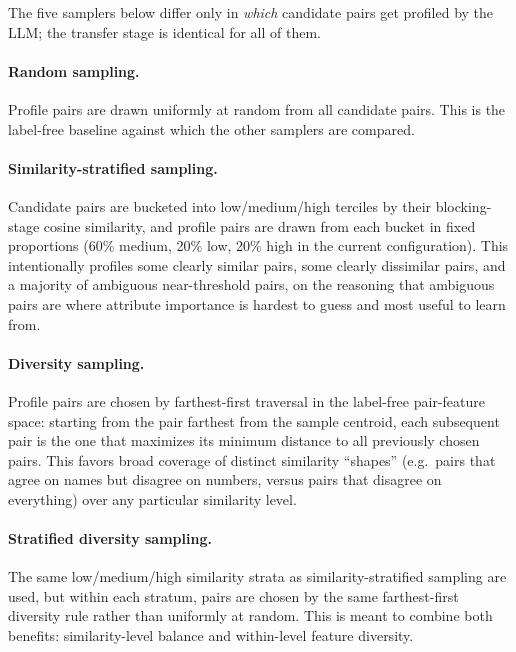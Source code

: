 \documentclass[11pt]{article}
\begin{document}
The five samplers below differ only in \emph{which} candidate pairs get profiled by
the LLM; the transfer stage is identical for all of them.

\paragraph{Random sampling.} Profile pairs are drawn uniformly at random from all
candidate pairs. This is the label-free baseline against which the other samplers
are compared.

\paragraph{Similarity-stratified sampling.} Candidate pairs are bucketed into
low/medium/high terciles by their blocking-stage cosine similarity, and profile
pairs are drawn from each bucket in fixed proportions (60\% medium, 20\% low, 20\%
high in the current configuration). This intentionally profiles some clearly
similar pairs, some clearly dissimilar pairs, and a majority of ambiguous
near-threshold pairs, on the reasoning that ambiguous pairs are where attribute
importance is hardest to guess and most useful to learn from.

\paragraph{Diversity sampling.} Profile pairs are chosen by farthest-first traversal
in the label-free pair-feature space: starting from the pair farthest from the
sample centroid, each subsequent pair is the one that maximizes its minimum
distance to all previously chosen pairs. This favors broad coverage of distinct
similarity ``shapes'' (e.g.\ pairs that agree on names but disagree on numbers, versus
pairs that disagree on everything) over any particular similarity level.

\paragraph{Stratified diversity sampling.} The same low/medium/high similarity
strata as similarity-stratified sampling are used, but within each stratum, pairs
are chosen by the same farthest-first diversity rule rather than uniformly at
random. This is meant to combine both benefits: similarity-level balance and
within-level feature diversity.
\end{document}
